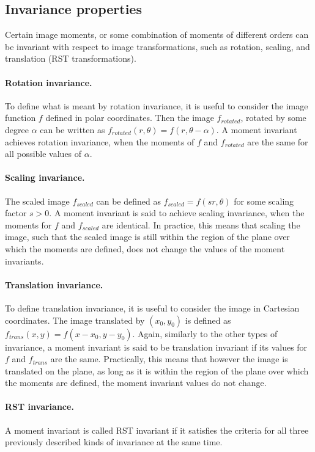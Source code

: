 \subsection{Invariance properties}
Certain image moments, or some combination of moments of different orders can be invariant with respect to image transformations, such as rotation, scaling, and translation (RST transformations).

\paragraph{Rotation invariance.} To define what is meant by rotation invariance, it is useful to consider the image function $f$ defined in polar coordinates. Then the image $f_{rotated}$, rotated by some degree $\alpha$ can be written as $f_{rotated}(r,\theta) = f(r,\theta - \alpha)$. A moment invariant achieves rotation invariance, when the moments of $f$ and $f_{rotated}$ are the same for all possible values of $\alpha$.   

\paragraph{Scaling invariance.} The scaled image $f_{scaled}$ can be defined as $f_{scaled} = f(sr, \theta)$ for some scaling factor $s > 0$. A moment invariant is said to achieve scaling invariance, when the moments for $f$ and $f_{scaled}$ are identical. In practice, this means that scaling the image, such that the scaled image is still within the region of the plane over which the moments are defined, does not change the values of the moment invariants.

\paragraph{Translation invariance.} To define translation invariance, it is useful to consider the image in Cartesian coordinates. The image translated by $(x_0, y_0)$ is defined as $f_{trans}(x,y) = f(x - x_0, y - y_0)$. Again, similarly to the other types of invariance, a moment invariant is said to be translation invariant if its values for $f$ and $f_{trans}$ are the same. Practically, this means that however the image is translated on the plane, as long as it is within the region of the plane over which the moments are defined, the moment invariant values do not change.

\paragraph{RST invariance.} A moment invariant is called RST invariant if it satisfies the criteria for all three previously described kinds of invariance at the same time. 


